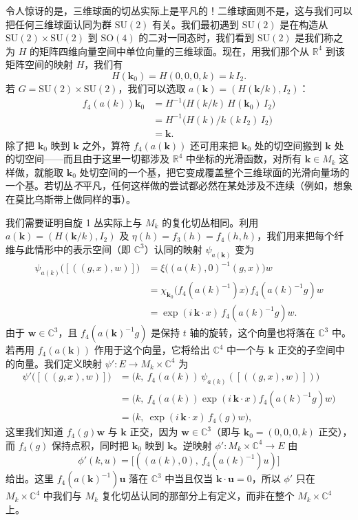 令人惊讶的是，三维球面的切丛实际上是平凡的！二维球面则不是，这与我们可以把任何三维球面认同为群 $\mathrm{SU}(2)$ 有关。我们最初遇到 $\mathrm{SU}(2)$ 是在构造从 $\mathrm{SU}(2)\times\mathrm{SU}(2)$ 到 $\mathrm{SO}(4)$ 的二对一同态时，我们看到 $\mathrm{SU}(2)$ 是我们称之为 $H$ 的矩阵四维向量空间中单位向量的三维球面。现在，用我们那个从 $\mathbb{R}^4$ 到该矩阵空间的映射 $H$，我们有
\[
H(\mathbf{k}_0)=H(0,0,0,k)=k\,I_2 .
\]
若 $G=\mathrm{SU}(2)\times\mathrm{SU}(2)$，我们可以选取 $a(\mathbf{k})=(H(\mathbf{k}/k),I_2)$：
\begin{align*}
f_4(a(k))\mathbf{k}_0
&=H^{-1}\big(H(k/k)\,H(\mathbf{k}_0)\,I_2\big)\\
&=H^{-1}\big(H(k)/k\,(k\,I_2)\,I_2\big)\\
&=\mathbf{k}.
\end{align*}
除了把 $\mathbf{k}_0$ 映到 $\mathbf{k}$ 之外，算符 $f_4(a(\mathbf{k}))$ 还可用来把 $\mathbf{k}_0$ 处的切空间搬到 $\mathbf{k}$ 处的切空间——而且由于这里一切都涉及 $\mathbb{R}^4$ 中坐标的光滑函数，对所有 $\mathbf{k}\in M_k$ 这样做，就能取 $\mathbf{k}_0$ 处切空间的一个基，把它变成覆盖整个三维球面的光滑向量场的一个基。若切丛\emph{不}平凡，任何这样做的尝试都必然在某处涉及不连续（例如，想象在莫比乌斯带上做同样的事）。

我们需要证明自旋 1 丛实际上与 $M_k$ 的复化切丛相同。利用 $a(\mathbf{k})=(H(\mathbf{k}/k),I_2)$ 及 $\eta(h)=f_3(h)=f_4(h,h)$，我们用来把每个纤维与此情形中的表示空间（即 $\mathbb{C}^3$）认同的映射 $\psi_{a(\mathbf{k})}$ 变为
\begin{align*}
\psi_{a(k)}\big([((g,x),w)]\big)
&=\xi\big((a(k),0)^{-1}(g,x)\big)w\\
&=\chi_{\mathbf{k}_0}\big(f_4(a(k)^{-1})x\big)\,f_4(a(k)^{-1}g)w\\
&=\exp(i\,\mathbf{k}\cdot x)\,f_4(a(k)^{-1}g)w .
\end{align*}
由于 $\mathbf{w}\in\mathbb{C}^3$，且 $f_4(a(\mathbf{k})^{-1}g)$ 是保持 $t$ 轴的旋转，这个向量也将落在 $\mathbb{C}^3$ 中。若再用 $f_4(a(\mathbf{k}))$ 作用于这个向量，它将给出 $\mathbb{C}^4$ 中一个与 $\mathbf{k}$ 正交的子空间中的向量。我们定义映射 $\psi':E\to M_k\times\mathbb{C}^4$ 为
\begin{align*}
\psi'\big([((g,x),w)]\big)
&=\big(k,\ f_4(a(k))\,\psi_{a(k)}([((g,x),w)])\big)\\
&=\big(k,\ f_4(a(k))\exp(i\,\mathbf{k}\cdot x)f_4(a(k)^{-1}g)w\big)\\
&=\big(k,\ \exp(i\,\mathbf{k}\cdot x)\,f_4(g)w\big),
\end{align*}
这里我们知道 $f_4(g)\mathbf{w}$ 与 $\mathbf{k}$ 正交，因为 $\mathbf{w}\in\mathbb{C}^3$（即与 $\mathbf{k}_0=(0,0,0,k)$ 正交），而 $f_4(g)$ 保持点积，同时把 $\mathbf{k}_0$ 映到 $\mathbf{k}$。逆映射 $\phi':M_k\times\mathbb{C}^4\to E$ 由
\[
\phi'(k,u)=\big[((a(k),0),\ f_4(a(k)^{-1})u)\big]
\]
给出。这里 $f_4(a(\mathbf{k})^{-1})\mathbf{u}$ 落在 $\mathbb{C}^3$ 中当且仅当 $\mathbf{k}\cdot\mathbf{u}=0$，所以 $\phi'$ 只在 $M_k\times\mathbb{C}^4$ 中我们与 $M_k$ 复化切丛认同的那部分上有定义，而非在整个 $M_k\times\mathbb{C}^4$ 上。

